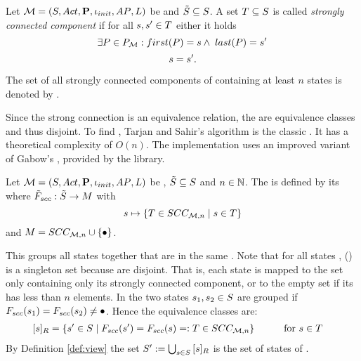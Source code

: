 \documentclass[preview]{standalone}
\begin{document}
\begin{definition}
	Let ${{{\mathcal{M}}}} = {{({S}, {Act}, {\textbf{P}}, {\iota_{init}}, {AP}, {L})}}$ be \achgphN and ${\tilde{{S}}} \subseteq {S}$. A set ${T} \subseteq {S}$ is called \emph{strongly connected component} if for all ${s}, {s}' \in {T}$ either it holds
	\[
		\exists \path \in \pathset : \pfirst(\path) = \state \land \; \plast(\path) = \state'
	\]
	{}
	\[
	 {s} = {s}'\text{.}
	\]
	
	\noindent
	The set of all strongly connected components of \chgph containing at least $n$ states is denoted by \setscc.
\end{definition}

Since the strong connection is an equivalence relation, the \sccsN are equivalence classes and thus disjoint. To find \sccsN, Tarjan and Sahir's algorithm is the classic \cite{Sharir1981}. It has a theoretical complexity of $O(n)$. The implementation uses an improved variant of Gabow's \cite{Gabow2000}, provided by the \jgrapht library.

\begin{definition}
	Let ${{{\mathcal{M}}}} = {{({S}, {Act}, {\textbf{P}}, {\iota_{init}}, {AP}, {L})}}$ be \achgphN, ${\tilde{{S}}} \subseteq {S}$ and $n \in {\mathbb{N}}$. The \viewN \viewscc is defined by its \grpfctN \gfctscc where ${{\tilde{F}_{{scc}}}} : {\tilde{{S}}} \to {\ensuremath{{M}}}$ with
	\[
	{s} \mapsto \{{T} \in {SCC_{\ensuremath{{{{\mathcal{M}}}}},n}} \mid {s} \in {T}\}
	\]
	and $\imggrp = \setscc \cup \remset$.
\end{definition}

This \viewN groups all states together that are in the same \sccN. Note that for all states \state, \gfctscc(\state) is a singleton set because \sccsN are disjoint. That is, each state is mapped to the set only containing only its strongly connected component, or to the empty set if its \sccN has less than $n$ elements. In the \viewN \viewscc two states ${s}_1, {s}_2 \in {S}$ are grouped if ${{F_{{scc}}}}({s}_1) = {{F_{{scc}}}}({s}_2) \neq {\bullet}$. Hence the equivalence classes are:
\begin{align*}
	{\ensuremath{{[{s}]_{{R}}}}} &= \{{s}' \in {S} \mid {\ensuremath{{F_{{scc}}}}}({s}') = {{F_{{scc}}}}({s}) =: {T} \in {SCC_{\ensuremath{{{{\mathcal{M}}}}},n}}\} \quad\quad\quad \text{for } {s} \in {T}
\end{align*}
By Definition \ref{def:view} the set ${S}' := \bigcup_{{s} \in {S}} {{[{s}]_{{R}}}}$ is the set of states of \viewexactcycle.
\end{document}
